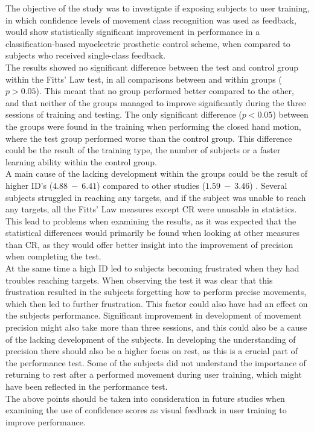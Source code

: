 The objective of the study was to investigate if exposing subjects to user training, in which confidence levels of movement class recognition was used as feedback, would show statistically significant improvement in performance in a classification-based myoelectric prosthetic control scheme, when compared to subjects who received single-class feedback. \\
The results showed no significant difference between the test and control group within the Fitts' Law test, in all comparisons between and within groups ($p > 0.05$). This meant that no group performed better compared to the other, and that neither of the groups managed to improve significantly during the three sessions of training and testing. The only significant difference ($p < 0.05$) between the groups were found in the training when performing the closed hand motion, where the test group performed worse than the control group. This difference could be the result of the training type, the number of subjects or a faster learning ability within the control group.\\
A main cause of the lacking development within the groups could be the result of higher ID's ($4.88~-~6.41$) compared to other studies ($1.59~-~3.46$) \cite{Scheme2013, Scheme2013a}. Several subjects struggled in reaching any targets, and if the subject was unable to reach any targets, all the Fitts' Law measures except CR were unusable in statistics. This lead to problems when examining the results, as it was expected that the statistical differences would primarily be found when looking at other measures than CR, as they would offer better insight into the improvement of precision when completing the test. \\
At the same time a high ID led to subjects becoming frustrated when they had troubles reaching targets. When observing the test it was clear that this frustration resulted in the subjects forgetting how to perform precise movements, which then led to further frustration. This factor could also have had an effect on the subjects performance. Significant improvement in development of movement precision might also take more than three sessions, and this could also be a cause of the lacking development of the subjects. In developing the understanding of precision there should also be a higher focus on rest, as this is a crucial part of the performance test. Some of the subjects did not understand the importance of returning to rest after a performed movement during user training, which might have been reflected in the performance test.\\
The above points should be taken into consideration in future studies when examining the use of confidence scores as visual feedback in user training to improve performance.

